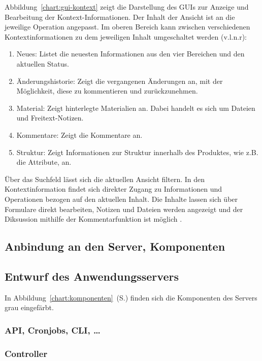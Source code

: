 Abbildung~\ref{chart:gui-kontext} zeigt die Darstellung des GUIs zur Anzeige und Bearbeitung der Kontext-Informationen. Der Inhalt der Ansicht ist an die jeweilige Operation angepasst. Im oberen Bereich kann zwischen verschiedenen Kontextinformationen zu dem jeweiligen Inhalt umgeschaltet werden  (v.l.n.r): 

\begin{enumerate}\itemsep -5pt
\item Neues: Listet die neuesten Informationen aus den vier Bereichen und den aktuellen Status.
\item Änderungshistorie: Zeigt die vergangenen Änderungen an, mit der Möglichkeit, diese zu kommentieren und zurückzunehmen.
\item Material: Zeigt hinterlegte Materialien an. Dabei handelt es sich um Dateien und Freitext-Notizen.
\item Kommentare: Zeigt die Kommentare an.
\item Struktur: Zeigt Informationen zur Struktur innerhalb des Produktes, wie z.B. die Attribute, an.
\end{enumerate}

Über das Suchfeld  lässt sich die aktuellen Ansicht filtern. In den Kontextinformation findet sich direkter Zugang zu Informationen und Operationen bezogen auf den aktuellen Inhalt. Die Inhalte lassen sich über Formulare  direkt bearbeiten, Notizen und Dateien werden angezeigt  und der Diksussion mithilfe der Kommentarfunktion ist möglich .

\subsection{Anbindung an den Server, Komponenten}

\subsection{Entwurf des Anwendungsservers}\label{l:entwurf-server}

In Abbildung~\ref{chart:komponenten}~(S.\pageref{chart:komponenten}) finden sich die Komponenten des Servers grau eingefärbt.

\subsubsection{API, Cronjobs, CLI, …}

\subsubsection{Controller}

